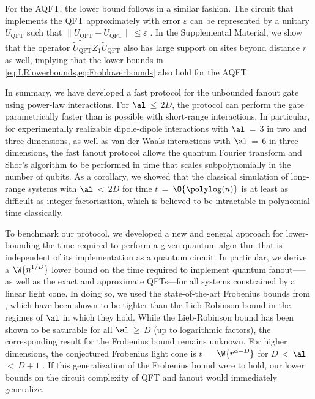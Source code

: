 For the AQFT, the lower bound follows in a similar fashion.
The circuit that implements the QFT approximately with error $\varepsilon$ can be represented by a unitary $\tilde{U}_\mathrm{QFT}$ such that $\|U_\mathrm{QFT}-\tilde {U}_\mathrm{QFT}\|\leq \varepsilon$ \cite{Cleve2000}.
In the Supplemental Material, we show that the operator $\tilde {U}_\mathrm{QFT}^\dag Z_1 \tilde {U}_\mathrm{QFT}$ also has large support on sites beyond distance $r$ as well, implying that the lower bounds in \cref{eq:LRlowerbounds,eq:Froblowerbounds} also hold for the AQFT.

In
summary, we have developed a fast protocol for the unbounded fanout gate using power-law interactions.
For $\al$\,$\le$\,$2D$, the protocol can perform the gate parametrically faster than is possible with short-range interactions.
In particular, for experimentally realizable dipole-dipole interactions with $\al$\,$=$\,$3$ in two and three dimensions, as well as van der Waals interactions with $\al$\,$=$\,$6$ in three dimensions, the fast fanout protocol allows the quantum Fourier transform and Shor's algorithm to be performed in time that scales subpolynomially in the number of qubits.
As a corollary, we showed that the classical simulation of long-range systems with $\al$\,$<$\,$2D$ for time $t$\,$=$\,$\O{\polylog(n)}$ is at least as difficult as integer factorization, which is believed to be intractable in polynomial time classically.

To benchmark our protocol, we developed a new and general approach for lower-bounding the time required to perform a given quantum algorithm that is independent of its implementation as a quantum circuit.
In particular, we derive a $\W{n^{1/D}}$ lower bound on the time required to implement quantum fanout—--as well as the exact and approximate QFTs---for all systems constrained by a linear light cone.
In doing so, we used the state-of-the-art Frobenius bounds from \cite{Tran2020hierarchylinearlightcones,Kuwahara2021,Chen2021Frobenius}, which have been shown to be tighter than the Lieb-Robinson bound in the regimes of $\al$ in which they hold.
While the Lieb-Robinson bound has been shown to be saturable for all $\al$\,$\ge$\,$D$ (up to logarithmic factors), the corresponding result for the Frobenius bound remains unknown.
For higher dimensions, the conjectured Frobenius light cone is $t$\,$=$\,$\W{r^{\alpha-D}}$ for $D$\,$<$\,$\al$\,$<$\,$D+1$ \cite{Chen2021Frobenius}.
If this generalization of the Frobenius bound were to hold, our lower bounds on the circuit complexity of QFT and fanout would immediately generalize.

